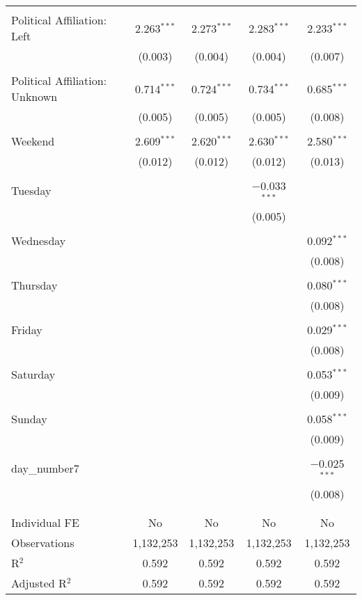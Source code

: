 \documentclass[
]{article}
\begin{document}
\begin{table}[!htbp]
{\begin{tabular}{@{\extracolsep{5pt}}lcccc}
  & & & & \\ 
 Political Affiliation: Left & 2.263$^{***}$ & 2.273$^{***}$ & 2.283$^{***}$ & 2.233$^{***}$ \\ 
  & (0.003) & (0.004) & (0.004) & (0.007) \\ 
  & & & & \\ 
 Political Affiliation: Unknown & 0.714$^{***}$ & 0.724$^{***}$ & 0.734$^{***}$ & 0.685$^{***}$ \\ 
  & (0.005) & (0.005) & (0.005) & (0.008) \\ 
  & & & & \\ 
 Weekend & 2.609$^{***}$ & 2.620$^{***}$ & 2.630$^{***}$ & 2.580$^{***}$ \\ 
  & (0.012) & (0.012) & (0.012) & (0.013) \\ 
  & & & & \\ 
 Tuesday &  &  & $-$0.033$^{***}$ &  \\ 
  &  &  & (0.005) &  \\ 
  & & & & \\ 
 Wednesday &  &  &  & 0.092$^{***}$ \\ 
  &  &  &  & (0.008) \\ 
  & & & & \\ 
 Thursday &  &  &  & 0.080$^{***}$ \\ 
  &  &  &  & (0.008) \\ 
  & & & & \\ 
 Friday &  &  &  & 0.029$^{***}$ \\ 
  &  &  &  & (0.008) \\ 
  & & & & \\ 
 Saturday &  &  &  & 0.053$^{***}$ \\ 
  &  &  &  & (0.009) \\ 
  & & & & \\ 
 Sunday &  &  &  & 0.058$^{***}$ \\ 
  &  &  &  & (0.009) \\ 
  & & & & \\ 
 day\_number7 &  &  &  & $-$0.025$^{***}$ \\ 
  &  &  &  & (0.008) \\ 
  & & & & \\ 
\hline \\[-1.8ex] 
Individual FE & No & No & No & No \\ 
Observations & 1,132,253 & 1,132,253 & 1,132,253 & 1,132,253 \\ 
R$^{2}$ & 0.592 & 0.592 & 0.592 & 0.592 \\ 
Adjusted R$^{2}$ & 0.592 & 0.592 & 0.592 & 0.592 \\ 

\end{tabular}}
\end{table}
\end{document}

